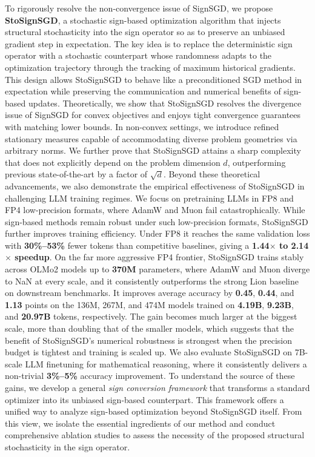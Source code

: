 \documentclass{article}
\begin{document}
To rigorously resolve the non-convergence issue of SignSGD, we propose \textbf{StoSignSGD}, a stochastic sign-based optimization algorithm that injects structural stochasticity into the sign operator so as to preserve an unbiased gradient step in expectation. The key idea is to replace the deterministic sign operator with a stochastic counterpart whose randomness adapts to the optimization trajectory through the tracking of maximum historical gradients. This design allows StoSignSGD to behave like a preconditioned SGD method in expectation while preserving the communication and numerical benefits of sign-based updates. Theoretically, we show that StoSignSGD resolves the divergence issue of SignSGD for convex objectives and enjoys tight convergence guarantees with matching lower bounds. In non-convex settings, we introduce refined stationary measures capable of accommodating diverse problem geometries via arbitrary norms. We further prove that StoSignSGD attains a sharp complexity that does not explicitly depend on the problem dimension $d$, outperforming previous state-of-the-art by a factor of $\sqrt{d}$. Beyond these theoretical advancements, we also demonstrate the empirical effectiveness of StoSignSGD in challenging LLM training regimes. We focus on pretraining LLMs in FP8 and FP4 low-precision formats, where AdamW and Muon fail catastrophically. While sign-based methods remain robust under such low-precision formats, StoSignSGD further improves training efficiency. Under FP8 it reaches the same validation loss with \textbf{30\%--53\%} fewer tokens than competitive baselines, giving a \textbf{1.44$\times$ to 2.14$\times$ speedup}. On the far more aggressive FP4 frontier, StoSignSGD trains stably across OLMo2 models up to \textbf{370M} parameters, where AdamW and Muon diverge to NaN at every scale, and it consistently outperforms the strong Lion baseline on downstream benchmarks. It improves average accuracy by \textbf{0.45}, \textbf{0.44}, and \textbf{1.13} points on the 136M, 267M, and 474M models trained on \textbf{4.19B}, \textbf{9.23B}, and \textbf{20.97B} tokens, respectively. The gain becomes much larger at the biggest scale, more than doubling that of the smaller models, which suggests that the benefit of StoSignSGD's numerical robustness is strongest when the precision budget is tightest and training is scaled up. We also evaluate StoSignSGD on 7B-scale LLM finetuning for mathematical reasoning, where it consistently delivers a non-trivial \textbf{3\%--5\%} accuracy improvement. To understand the source of these gains, we develop a general \emph{sign conversion framework} that transforms a standard optimizer into its unbiased sign-based counterpart. This framework offers a unified way to analyze sign-based optimization beyond StoSignSGD itself. From this view, we isolate the essential ingredients of our method and conduct comprehensive ablation studies to assess the necessity of the proposed structural stochasticity in the sign operator.
\end{document}
